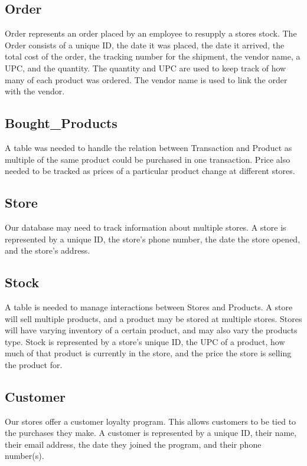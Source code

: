 \documentclass{article}
\begin{document}
		\subsection{Order}
			Order represents an order placed by an employee to resupply a stores
			stock. The Order consists of a unique ID, the date it was placed, the date
			it arrived, the total cost of the order, the tracking number for the
			shipment, the vendor name, a UPC, and the quantity. The quantity and UPC
			are used to keep track of how many of each product was ordered. The vendor
			name is used to link the order with the vendor.

		\subsection{Bought\_Products}
			A table was needed to handle the relation between Transaction and Product
			as multiple of the same product could be purchased in one transaction.
			Price also needed to be tracked as prices of a particular product change
			at different stores.

		\subsection{Store}
			Our database may need to track information about multiple stores. A store
			is represented by a unique ID, the store's phone number, the date the
			store opened, and the store's address.

		\subsection{Stock}
			A table is needed to manage interactions between Stores and Products.
			A store will sell multiple products, and a product may be stored at
			multiple stores. Stores will have varying inventory of a certain product,
			and may also vary the products type. Stock is represented by a store's
			unique ID, the UPC of a product, how much of that product is currently in
			the store, and the price the store is selling the product for.

		\subsection{Customer}
			Our stores offer a customer loyalty program. This allows customers to be
			tied to the purchases they make. A customer is represented by a unique ID,
			their name, their email address, the date they joined the program, and
			their phone number(s).
\end{document}
